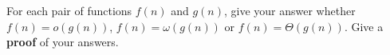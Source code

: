 
For each pair of functions \(f(n)\) and \(g(n)\), give your answer whether \(f(n) = o(g(n))\), \(f(n) = \omega(g(n))\) or \(f(n) = \Theta(g(n))\).  Give a \textbf{proof} of your answers.

\begin{parts}
    \part[3] \par
    \[f(n) = \log(n!)\]
    \[g(n) = \log(n^n)\]
    
    \begin{solution}
    \vspace{6.5in}
    \end{solution}
\newpage
    \part[3] \par
    \[f(n) = n^{1+\varepsilon}, \qquad (\varepsilon\in \mathbb{R}^+)\]
    \[g(n) = n(\log n)^k, \qquad (k\in \mathbb{Z}^+)\]
    
    \begin{solution}
    \vspace{6.5in}
    \end{solution}

\end{parts}
